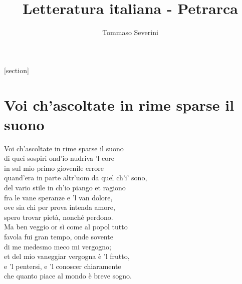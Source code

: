 \documentclass[10pt,a4paper]{article}
\author{Tommaso Severini}
\title{Letteratura italiana - Petrarca}
\begin{document}
	\maketitle
	
	\tableofcontents
	
	[section]
	
	\section{Voi ch'ascoltate in rime sparse il suono}
	\label{sec:Voi ch'ascoltate in rime sparse il suono}
	
	\begin{estratto}
		Voi ch’ascoltate in rime sparse il suono\\
		di quei sospiri ond’io nudriva ’l core\\
		in sul mio primo giovenile errore\\
		quand’era in parte altr’uom da quel ch’i’ sono,\\
		
		del vario stile in ch’io piango et ragiono\\
		fra le vane speranze e ’l van dolore,\\
		ove sia chi per prova intenda amore,\\
		spero trovar pietà, nonché perdono.\\
		
		Ma ben veggio or sì come al popol tutto\\
		favola fui gran tempo, onde sovente\\
		di me medesmo meco mi vergogno;\\
		
		et del mio vaneggiar vergogna è ’l frutto,\\
		e ’l pentersi, e ’l conoscer chiaramente\\
		che quanto piace al mondo è breve sogno.\\
	\end{estratto}
\end{document}
